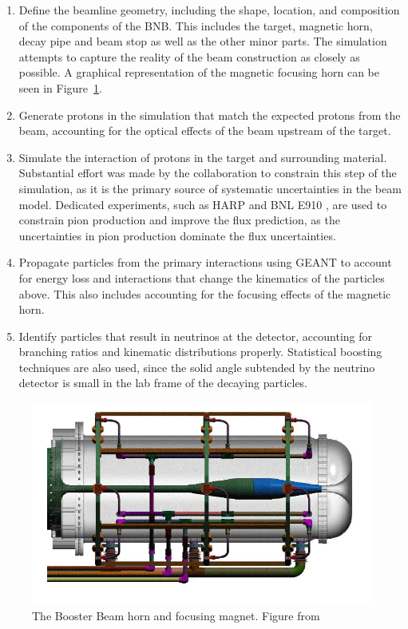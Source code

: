\begin{enumerate}

\item{Define the beamline geometry, including the shape, location, and composition of the components of the BNB.  This includes the target, magnetic horn, decay pipe and beam stop as well as the other minor parts.  The simulation attempts to capture the reality of the beam construction as closely as possible.  A graphical representation of the magnetic focusing horn can be seen in Figure~\ref{fig:mbhorn}.}

\item{Generate protons in the simulation that match the expected protons from the beam, accounting for the optical effects of the beam upstream of the target.}

\item{Simulate the interaction of protons in the target and surrounding material.  Substantial effort was made by the \MB collaboration to constrain this step of the simulation, as it is the primary source of systematic uncertainties in the beam model.  Dedicated experiments, such as HARP \cite{Catanesi:2007ab} and BNL E910 \cite{Chemakin:2007aa}, are used to constrain pion production and improve the flux prediction, as the uncertainties in pion production dominate the flux uncertainties.}

\item{Propagate particles from the primary interactions using GEANT\cite{Agostinelli:2002hh} to account for energy loss and interactions that change the kinematics of the particles above.  This also includes accounting for the focusing effects of the magnetic horn.}

\item{Identify particles that result in neutrinos at the detector, accounting for branching ratios and kinematic distributions properly.  Statistical boosting techniques are also used, since the solid angle subtended by the neutrino detector is small in the lab frame of the decaying particles.}

\end{enumerate}

\begin{figure}[tb]
  \centering
  \includegraphics[width=\textwidth]{beams_figures/mbhorn}
  \caption[BNB Horn and Focusing Magnet]{The Booster Beam horn and focusing magnet.  Figure from \cite{AguilarArevalo:2008yp}}
  \label{fig:mbhorn}
\end{figure}

